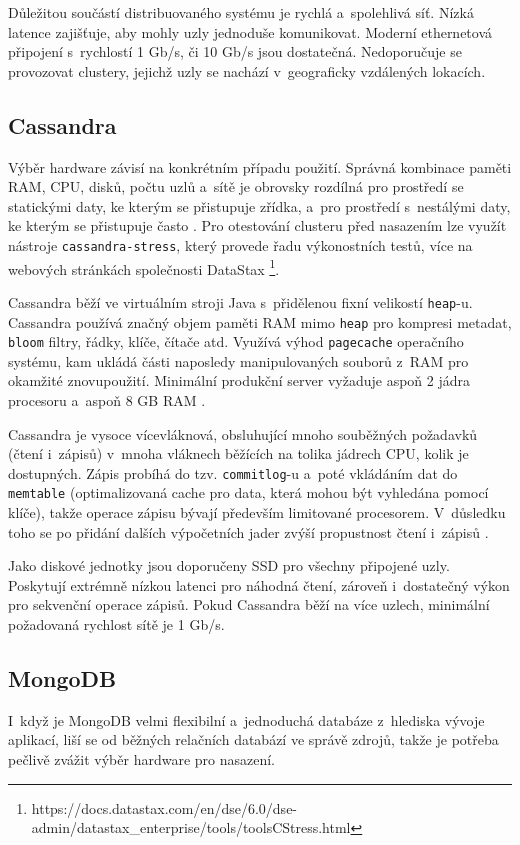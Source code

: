 Důležitou součástí distribuovaného systému je rychlá a~spolehlivá síť. Nízká latence zajišťuje, aby mohly uzly jednoduše komunikovat. Moderní ethernetová připojení s~rychlostí 1 Gb/s, či 10 Gb/s jsou dostatečná. Nedoporučuje se provozovat clustery, jejichž uzly se nachází v~geograficky vzdálených lokacích.

\subsection{Cassandra}
Výběr hardware závisí na konkrétním případu použití. Správná kombinace paměti RAM, CPU, disků, počtu uzlů a~sítě je obrovsky rozdílná pro prostředí se statickými daty, ke kterým se přistupuje zřídka, a~pro prostředí s~nestálými daty, ke kterým se přistupuje často \cite{cassandraPlanningHW}. Pro otestování clusteru před nasazením lze využít nástroje \texttt{cassandra-stress}, který provede řadu výkonostních testů, více na webových stránkách společnosti DataStax \footnote{https://docs.datastax.com/en/dse/6.0/dse-admin/datastax\_enterprise/tools/toolsCStress.html}.

Cassandra běží ve virtuálním stroji Java s~přidělenou fixní velikostí \texttt{heap}-u. Cassandra používá značný objem paměti RAM mimo \texttt{heap} pro kompresi metadat, \texttt{bloom} filtry, řádky, klíče, čítače atd. Využívá výhod \texttt{pagecache} operačního systému, kam ukládá části naposledy manipulovaných souborů z~RAM pro okamžité znovupoužití. 
Minimální produkční server vyžaduje aspoň 2 jádra procesoru a~aspoň 8 GB RAM \cite{cassandraHW}.

Cassandra je vysoce vícevláknová, obsluhující mnoho souběžných požadavků (čtení i~zápisů) v~mnoha vláknech běžících na tolika jádrech CPU, kolik je dostupných. Zápis probíhá do tzv. \texttt{commitlog}-u a~poté vkládáním dat do \texttt{memtable} (optimalizovaná cache pro data, která mohou být vyhledána pomocí klíče), takže operace zápisu bývají především limitované procesorem. V~důsledku toho se po přidání dalších výpočetních jader zvýší propustnost čtení i~zápisů \cite{cassandraHW}.

Jako diskové jednotky jsou doporučeny SSD pro všechny připojené uzly. Poskytují extrémně nízkou latenci pro náhodná čtení, zároveň i~dostatečný výkon pro sekvenční operace zápisů. Pokud Cassandra běží na více uzlech, minimální požadovaná rychlost sítě je 1 Gb/s.

\subsection{MongoDB}
I~když je MongoDB velmi flexibilní a~jednoduchá databáze z~hlediska vývoje aplikací, liší se od běžných relačních databází ve správě zdrojů, takže je potřeba pečlivě zvážit výběr hardware pro nasazení.

